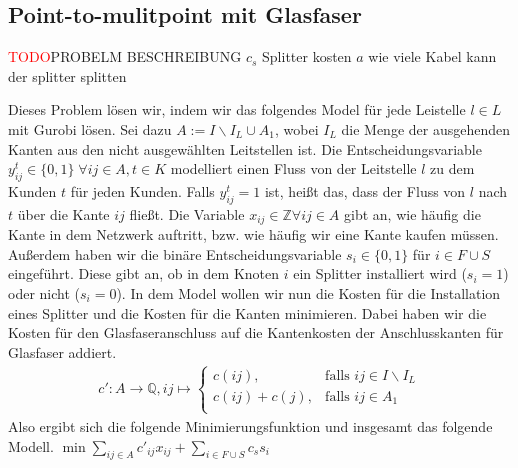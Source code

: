 \documentclass[11pt,a4paper]{article}
\newcommand{\Z}{\mathbb{Z}}
\newcommand{\Q}{\mathbb{Q}}
\newcommand{\TODO}{\textcolor{red}{TODO}}
\theoremstyle{my_th_style1}
\begin{document}
 
 \subsection{Point-to-mulitpoint mit Glasfaser}
\TODO PROBELM BESCHREIBUNG $c_s$ Splitter kosten $a$ wie viele Kabel kann der splitter splitten

Dieses Problem lösen wir, indem wir das folgendes Model für jede Leistelle $l \in L $ mit Gurobi lösen. Sei dazu $A:= I\backslash I_L \cup A_1$, wobei $I_L$ die Menge der ausgehenden Kanten aus den nicht ausgewählten Leitstellen ist.
Die Entscheidungsvariable $y_{ij}^t \in \{0,1\}\; \forall ij \in A, t \in K$ modelliert einen Fluss von der Leitstelle $l$ zu dem Kunden $t$ für jeden Kunden. Falls $y_{ij}^t=1$ ist, heißt das, dass der Fluss von $l$ nach $t$ über die Kante $ij$ fließt.
Die Variable $x_{ij} \in \Z \forall ij \in A $ gibt an, wie häufig die Kante in dem Netzwerk auftritt, bzw. wie häufig wir eine Kante kaufen müssen. Außerdem haben wir die binäre Entscheidungsvariable $s_i \in \{0,1\}$ für $i \in F \cup S$ eingeführt. Diese gibt an, ob in dem Knoten $i$ ein Splitter installiert wird ($s_i=1$) oder nicht ($s_i=0$). In dem Model wollen wir nun die Kosten für die Installation eines Splitter und die Kosten für die Kanten minimieren. Dabei haben wir die Kosten für den Glasfaseranschluss auf die Kantenkosten der Anschlusskanten für Glasfaser addiert.
\begin{align*}
c': A \rightarrow \Q, ij  \mapsto \left\{\begin{array}{cl} 
c(ij), & \text{falls } ij \in I\backslash I_L\\ 
c(ij)+c(j), & \text{falls } ij \in A_1\\ 
\end{array}
\right.
\end{align*}
Also ergibt sich die folgende Minimierungsfunktion und insgesamt das folgende Modell.
 \bigskip
 $\min \displaystyle\sum_{ij \in A} c'_{ij} x_{ij} + \displaystyle\sum_{i \in F \cup S} c_s s_i $
\end{document}
